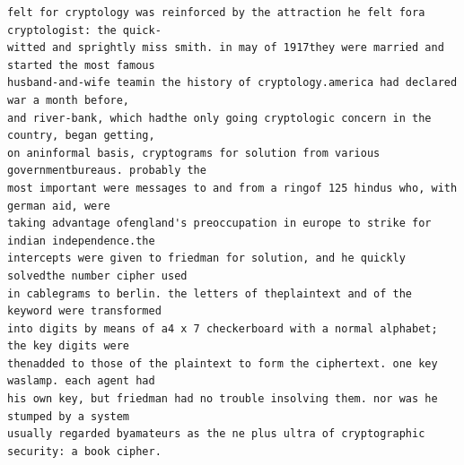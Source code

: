 \begin{lstlisting}[language={}]
felt for cryptology was reinforced by the attraction he felt fora cryptologist: the quick-
witted and sprightly miss smith. in may of 1917they were married and started the most famous
husband-and-wife teamin the history of cryptology.america had declared war a month before,
and river-bank, which hadthe only going cryptologic concern in the country, began getting,
on aninformal basis, cryptograms for solution from various governmentbureaus. probably the
most important were messages to and from a ringof 125 hindus who, with german aid, were
taking advantage ofengland's preoccupation in europe to strike for indian independence.the
intercepts were given to friedman for solution, and he quickly solvedthe number cipher used
in cablegrams to berlin. the letters of theplaintext and of the keyword were transformed
into digits by means of a4 x 7 checkerboard with a normal alphabet;  the key digits were
thenadded to those of the plaintext to form the ciphertext. one key waslamp. each agent had
his own key, but friedman had no trouble insolving them. nor was he stumped by a system
usually regarded byamateurs as the ne plus ultra of cryptographic security: a book cipher.
\end{lstlisting}

